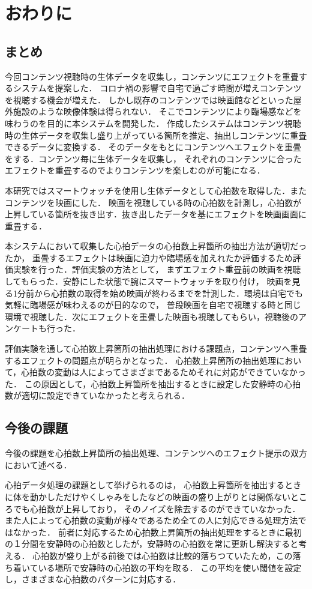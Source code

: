 \chapter{おわりに}

\section{まとめ}
今回コンテンツ視聴時の生体データを収集し，コンテンツにエフェクトを重畳するシステムを提案した．
コロナ禍の影響で自宅で過ごす時間が増えコンテンツを視聴する機会が増えた．
しかし既存のコンテンツでは映画館などといった屋外施設のような映像体験は得られない．
そこでコンテンツにより臨場感などを味わうのを目的に本システムを開発した．
作成したシステムはコンテンツ視聴時の生体データを収集し盛り上がっている箇所を推定、抽出しコンテンツに重畳できるデータに変換する．
そのデータをもとにコンテンツへエフェクトを重畳をする．コンテンツ毎に生体データを収集し，
それぞれのコンテンツに合ったエフェクトを重畳するのでよりコンテンツを楽しむのが可能になる．

本研究ではスマートウォッチを使用し生体データとして心拍数を取得した．またコンテンツを映画にした．
映画を視聴している時の心拍数を計測し，心拍数が上昇している箇所を抜き出す．抜き出したデータを基にエフェクトを映画画面に重畳する．

本システムにおいて収集した心拍データの心拍数上昇箇所の抽出方法が適切だったか，
重畳するエフェクトは映画に迫力や臨場感を加えれたか評価するため評価実験を行った．評価実験の方法として，
まずエフェクト重畳前の映画を視聴してもらった．安静にした状態で腕にスマートウォッチを取り付け，
映画を見る1分前から心拍数の取得を始め映画が終わるまでを計測した．環境は自宅でも気軽に臨場感が味わえるのが目的なので，
普段映画を自宅で視聴する時と同じ環境で視聴した．次にエフェクトを重畳した映画も視聴してもらい，視聴後のアンケートも行った．

評価実験を通して心拍数上昇箇所の抽出処理における課題点，コンテンツへ重畳するエフェクトの問題点が明らかとなった．
心拍数上昇箇所の抽出処理において，心拍数の変動は人によってさまざまであるためそれに対応ができていなかった．
この原因として，心拍数上昇箇所を抽出するときに設定した安静時の心拍数が適切に設定できていなかったと考えられる．

\section{今後の課題}
今後の課題を心拍数上昇箇所の抽出処理、コンテンツへのエフェクト提示の双方において述べる．

心拍データ処理の課題として挙げられるのは，
心拍数上昇箇所を抽出するときに体を動かしただけやくしゃみをしたなどの映画の盛り上がりとは関係ないところでも心拍数が上昇しており，
そのノイズを除去するのができていなかった．また人によって心拍数の変動が様々であるため全ての人に対応できる処理方法ではなかった．
前者に対応するため心拍数上昇箇所の抽出処理をするときに最初の１分間を安静時の心拍数としたが，安静時の心拍数を常に更新し解決すると考える．
心拍数が盛り上がる前後では心拍数は比較的落ちつていたため，この落ち着いている場所で安静時の心拍数の平均を取る．
この平均を使い閾値を設定し，さまざまな心拍数のパターンに対応する．

